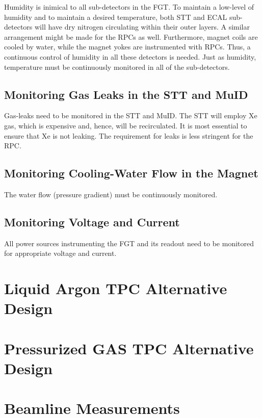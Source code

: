 Humidity is inimical to all sub-detectors in the FGT. To maintain a low-level of 
humidity and to maintain a desired temperature, both STT and ECAL sub-detectors
will have dry nitrogen circulating within their outer layers. A similar arrangement 
might be made for the RPCs as well. Furthermore, magnet coils are cooled by water, 
while the magnet yokes are instrumented with RPCs. Thus, a continuous control of 
humidity in all these detectors is needed.
Just as humidity, temperature must be continuously monitored in all of the sub-detectors.

\subsection{Monitoring Gas Leaks in the STT and MuID}

Gas-leaks need to be monitored in the STT and MuID.
The STT will employ Xe gas, which is expensive and, hence, will be recirculated. It is 
most essential to ensure that Xe is not leaking. The requirement for leaks is less 
stringent for the RPC. 

\subsection{Monitoring Cooling-Water Flow in the Magnet}

The water flow (pressure gradient) must be continuously monitored.

\subsection{Monitoring Voltage and Current}

All power sources instrumenting the FGT and its readout need to be monitored for 
appropriate voltage and current.

\section{Liquid Argon TPC Alternative Design}

\section{Pressurized GAS TPC Alternative Design}

\section{Beamline Measurements}

